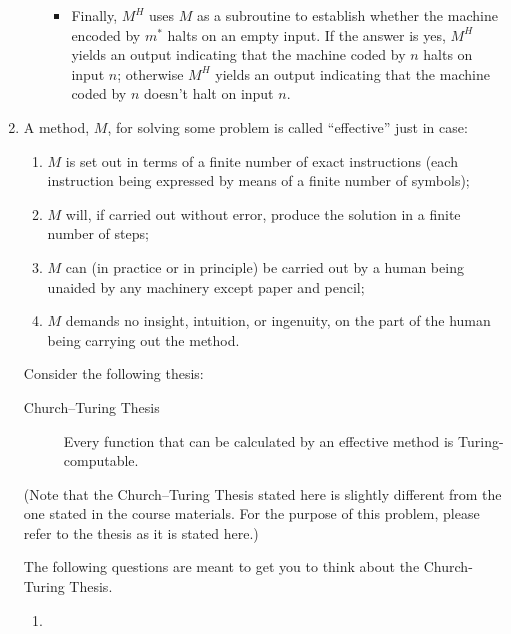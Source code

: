 \documentclass[12pt,letterpaper]{article}
\begin{document}
\begin{enumerate}
\begin{enumerate}
{{\begin{itemize}
\item Finally, $M^H$ uses $M$ as a subroutine to establish whether the machine encoded by $m^*$ halts on an empty input. If the answer is yes, $M^H$ yields an output indicating that the machine coded by $n$ halts on input $n$; otherwise $M^H$ yields an output indicating that the machine coded by $n$ doesn't halt on input $n$.
\end{itemize}
}
} %






\end{enumerate}


\item A method, $M$, for solving some problem is called ``effective'' just in case:
\begin{enumerate}[label=(\roman*)]
\item $M$ is set out in terms of a finite number of exact instructions (each instruction being expressed by means of a finite number of symbols);
\item $M$ will, if carried out without error, produce the solution in a finite number of steps;
\item $M$ can (in practice or in principle) be carried out by a human being unaided by any machinery except paper and pencil;
\item $M$ demands no insight, intuition, or ingenuity, on the part of the human being carrying out the method.
\end{enumerate}
Consider the following thesis:
\begin{description}
\item[Church--Turing Thesis] Every function that can be calculated by an effective method is Turing-computable.
\end{description}
(Note that the Church--Turing Thesis stated here is slightly different from the one stated in the course materials. For the purpose of this problem, please refer to the thesis as it is stated here.)

The following questions are meant to get you to think about the Church-Turing Thesis.

\begin{enumerate}
\item {}
\end{enumerate}
\end{enumerate}
\end{document}
